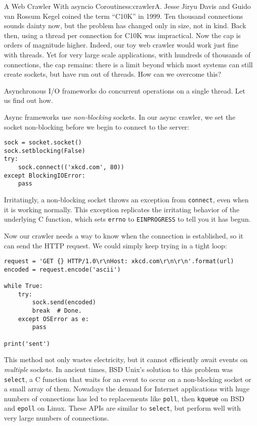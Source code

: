 \begin{aosachapter}{A Web Crawler With asyncio Coroutines}{s:crawler}{A. Jesse Jiryu Davis and Guido van Rossum}
Kegel coined the term ``C10K'' in 1999. Ten thousand connections sounds
dainty now, but the problem has changed only in size, not in kind. Back
then, using a thread per connection for C10K was impractical. Now the
cap is orders of magnitude higher. Indeed, our toy web crawler would
work just fine with threads. Yet for very large scale applications, with
hundreds of thousands of connections, the cap remains: there is a limit
beyond which most systems can still create sockets, but have run out of
threads. How can we overcome this?

\label{async}

Asynchronous I/O frameworks do concurrent operations on a single thread.
Let us find out how.

Async frameworks use \emph{non-blocking} sockets. In our async crawler,
we set the socket non-blocking before we begin to connect to the server:

\begin{verbatim}
sock = socket.socket()
sock.setblocking(False)
try:
    sock.connect(('xkcd.com', 80))
except BlockingIOError:
    pass
\end{verbatim}

Irritatingly, a non-blocking socket throws an exception from
\texttt{connect}, even when it is working normally. This exception
replicates the irritating behavior of the underlying C function, which
sets \texttt{errno} to \texttt{EINPROGRESS} to tell you it has begun.

Now our crawler needs a way to know when the connection is established,
so it can send the HTTP request. We could simply keep trying in a tight
loop:

\begin{verbatim}
request = 'GET {} HTTP/1.0\r\nHost: xkcd.com\r\n\r\n'.format(url)
encoded = request.encode('ascii')

while True:
    try:
        sock.send(encoded)
        break  # Done.
    except OSError as e:
        pass

print('sent')
\end{verbatim}

This method not only wastes electricity, but it cannot efficiently await
events on \emph{multiple} sockets. In ancient times, BSD Unix's solution
to this problem was \texttt{select}, a C function that waits for an
event to occur on a non-blocking socket or a small array of them.
Nowadays the demand for Internet applications with huge numbers of
connections has led to replacements like \texttt{poll}, then
\texttt{kqueue} on BSD and \texttt{epoll} on Linux. These APIs are
similar to \texttt{select}, but perform well with very large numbers of
connections.


\end{aosachapter}
